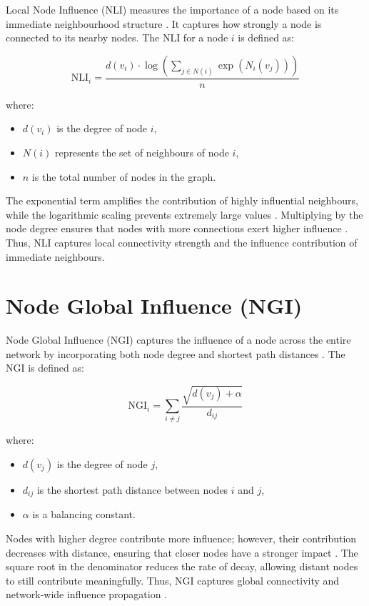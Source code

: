Local Node Influence (NLI) measures the importance of a node based on 
its immediate neighbourhood structure \cite{guo2026}. It captures how 
strongly a node is connected to its nearby nodes. The NLI for a node 
$i$ is defined as:

\begin{equation}
\text{NLI}_i = \frac{d(v_i) \cdot \log\!\left(\displaystyle\sum_{j 
\in N(i)} \exp\!\left(N_i(v_j)\right)\right)}{n}
\end{equation}

\noindent where:
\begin{itemize}
    \item $d(v_i)$ is the degree of node $i$,
    \item $N(i)$ represents the set of neighbours of node $i$,
    \item $n$ is the total number of nodes in the graph.
\end{itemize}

The exponential term amplifies the contribution of highly influential 
neighbours, while the logarithmic scaling prevents extremely large 
values \cite{guo2026}. Multiplying by the node degree ensures that 
nodes with more connections exert higher influence \cite{ chen2012}. Thus, NLI captures local connectivity strength and the 
influence contribution of immediate neighbours.

\section{Node Global Influence (NGI)}

Node Global Influence (NGI) captures the influence of a node across 
the entire network by incorporating both node degree and shortest path 
distances \cite{guo2026, mukhtar}. The NGI is defined as:

\begin{equation}
\text{NGI}_i = \sum_{i \neq j} \frac {\sqrt{d(v_j) + \alpha}}{{d_{ij}}}
\end{equation}

\noindent where:
\begin{itemize}
    \item $d(v_j)$ is the degree of node $j$,
    \item $d_{ij}$ is the shortest path distance between nodes $i$ 
    and $j$,
    \item $\alpha$ is a balancing constant.
\end{itemize}

Nodes with higher degree contribute more influence; however, their 
contribution decreases with distance, ensuring that closer nodes have 
a stronger impact \cite{guo2026, chen2012}. The square root in the 
denominator reduces the rate of decay, allowing distant nodes to still 
contribute meaningfully. Thus, NGI captures global connectivity and 
network-wide influence propagation \cite{mukhtar}.

